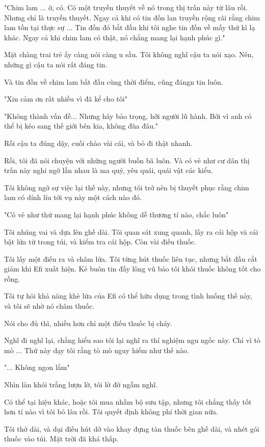 "Chim lam ... ờ, có. Có một truyền thuyết về nó trong thị trấn này từ lâu rồi. Nhưng chỉ là truyền thuyết. Ngay cả khi có tin đồn lan truyền rộng rãi rằng chim lam tồn tại thực sự ... Tin đồn đó bắt đầu khi tôi nghe tin đồn về mấy thứ kì lạ khác. Ngay cả khi chim lam có thật, nó chẳng mang lại hạnh phúc gì."

Mặt chàng trai trẻ ấy càng nói càng u sầu. Tôi không nghĩ cậu ta nói xạo. Nên, những gì cậu ta nói rất đáng tin.

Và tin đồn về chim lam bắt đầu cùng thời điểm, cũng đángn tin luôn.

"Xin cảm ơn rất nhiều vì đã kể cho tôi"

"Không thành vấn đề... Nhưng hãy bảo trọng, hỡi người lũ hành. Bởi vì anh có thể bị kéo sang thế giới bên kia, không đùa đâu."

Rồi cậu ta đúng dậy, cuối chào vài cái, và bỏ đi thật nhanh.

Rồi, tôi đã nói chuyện với những người buồn bã luôn. Và có vẻ như cư dân thị trấn này nghi ngờ lẫn nhau là ma quỷ, yêu quái, quái vật các kiểu.

Tôi không ngờ sự việc lại thế này, nhưng tôi trở nên bị thuyết phục rằng chim lam có dính líu tới vụ này một cách nào đó.

"Có vẻ như thứ mang lại hạnh phúc không dễ thương tí nào, chắc luôn"

Tôi nhúng vai và dựa lên ghế dài. Tôi quan sát xung quanh, lấy ra cái hộp và cái bật lửa từ trong túi, và kiểm tra cái hộp. Còn vài điếu thuốc.

Tôi lấy một điếu ra và châm lửa. Tôi từng hút thuốc liên tục, nhưng bắt đầu cắt giảm khi Efi xuất hiện. Kẻ buôn tin đầy lông vũ bảo tôi khói thuốc không tốt cho rồng. 

Tôi tự hỏi khả năng khè lửa của Efi có thể hữu dụng trong tình huống thế này, và tôi sẽ nhờ nó châm thuốc. 

Nói cho đủ thì, nhiều hơn chỉ một điếu thuốc bị cháy.

Nghĩ đi nghĩ lại, chẳng hiểu sao tôi lại nghĩ ra thí nghiệm ngu ngốc này. Chỉ vì tò mò ... Thứ này dạy tôi rằng tò mò nguy hiểm như thế nào.

"... Không ngon lắm"

Nhìn làn khói trắng lượn lờ, tôi lờ đờ ngẫm nghĩ.

Có thể tại hiệu khác, hoặc tôi mua nhầm bộ sưu tập, nhưng tôi chẳng thấy tốt hơn tí nào vì tôi bỏ lâu rồi. Tôi quyết định không phí thời gian nữa.

Tôi thở dài, và dụi điếu hút dở vào khay đựng tàn thuốc bên ghế dài, và nhét gói thuốc vào túi. Mặt trời đã khá thấp.

